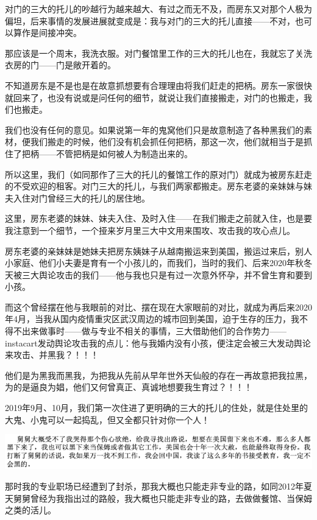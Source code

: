 \documentclass[9pt, b5paper]{article}
\begin{document}
对门的三大的托儿的吵越行为越来越大、有过之而无不及，而房东又对那个人极为偏坦，后来事情的发展进展就变成是：我与对门的三大的托儿直接——不对，也可以算作是间接冲突。

那应该是一个周末，我洗衣服。对门餐馆里工作的三大的托儿也在，我就忘了关洗衣房的门——门是敞开着的。

不知道房东是不是也是在故意抓想要有合理理由将我们赶走的把柄。房东一家很快就回来了，也没有说或是问任何的细节，就说让我们直接搬走，对门的也搬走，我们也搬走。

我们也没有任何的意见。如果说第一年的鬼窝他们只是故意制造了各种黑我们的素材，便我们搬走的时候，他们没有机会抓任何把柄，那这一次，他们就相当于是抓住了把柄——不管把柄是如何被人为制造出来的。 

所以这里，我们（如同那作了三大的托儿的餐馆工作的原对门）就成为被房东赶走的不受欢迎的租客。对门三大的托儿，与我们两家都搬走。房东老婆的亲妹妹与妹夫入住对门曾经三大的托儿的居住地。 



这里，房东老婆的妹妹、妹夫入住、及时入住——在我们搬走之前就入住，也是要我注意到一个细节，一个挜来岁月里三大中文用来围攻、攻击我的攻心点儿。 

房东老婆的亲妹妹是她妹夫把房东姨妹子从越南搬运来到美国，搬运过来后，别人小家庭、他们小夫妻是育有一个小孩儿的，而我们，当时的我们、后来2020年秋冬天被三大舆论攻击的我们——他与我也只是有过一次意外怀孕，并不曾生育和要到小孩。

而这个曾经摆在他与我眼前的对比、摆在现在大家眼前的对比，就成为再后来2020年4月，当我从国内疫情重灾区武汉周边的城市回到美国，迫于生存的压力，我不得不出来做事时——做与专业不相关的事情，三大借助他们的合作势力——instacart发动舆论攻击我的点儿：他与我婚内没有小孩，便注定会被三大发动舆论来攻击、并黑我？！！！

他们是为黑我而黑我，为把我从先前从早年世外天仙般的存在一再故意把我拉黑，为的是逼良为娼，他们又何曾真正、真诚地想要我生育过？！！！

2019年9月、10月，我们第一次住进了更明确的三大的托儿的住处，就是住处里的大鬼、小鬼可以一起捣乱，但又全都只针对你一个人！

\begin{center}
\includegraphics[width=.9\linewidth]{./pic/p1p119-5.png}
\end{center}

那时我的专业职场已经遭到了封杀，那我大概也只能走非专业的路，如同2012年夏天舅舅曾经为我指出过的路般，我大概也只能走非专业的路，去做做餐馆、当保姆之类的活儿。
\end{document}
